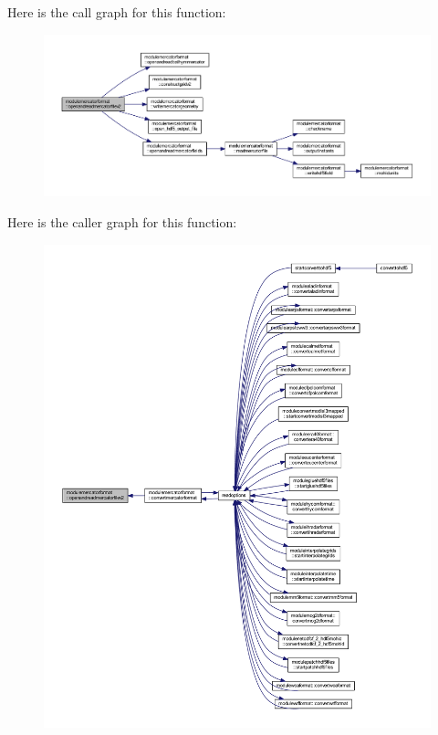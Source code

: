 Here is the call graph for this function\+:\nopagebreak
\begin{figure}[H]
\begin{center}
\leavevmode
\includegraphics[width=350pt]{namespacemodulemercatorformat_ac844e04662b11a4b75858e60dcdd690a_cgraph}
\end{center}
\end{figure}
Here is the caller graph for this function\+:\nopagebreak
\begin{figure}[H]
\begin{center}
\leavevmode
\includegraphics[width=350pt]{namespacemodulemercatorformat_ac844e04662b11a4b75858e60dcdd690a_icgraph}
\end{center}
\end{figure}
\mbox{\label{namespacemodulemercatorformat_ad3d103ba2c19d6a10af53c4f7caf2a16}} 
